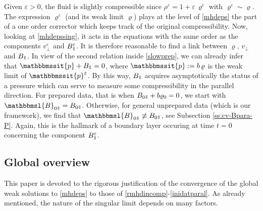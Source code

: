 \documentclass[11pt,reqno]{amsart}
\newcommand{\myparallel}{{\mkern3mu\vphantom{\perp}\vrule depth 0pt\mkern2mu\vrule depth 0pt\mkern3mu}}
\begin{document}
Given $ \varepsilon >0 $, the fluid is slightly compressible since $ \rho^\varepsilon = 1 + \varepsilon \, \varrho^\varepsilon $ with $  \varrho^\varepsilon \sim \varrho $. The expression $ \varrho^\varepsilon $ (and  its weak limit $ \varrho $) plays at the level of \eqref{mhdeps} the part of a one order corrector which keeps track of the original compressibility. Now, looking at \eqref{mhdepssing}, it acts in the equations with the same order as the components $ v^\varepsilon_\perp $ and $  B^\varepsilon_\myparallel $. It is therefore reasonable to find a link between $ \varrho $, $  v_\perp $ and $ B_\myparallel $. In view of the second relation inside  \eqref{slowprep}, we can already infer that $ \mathbbmssit{p} + B_\myparallel = 0 $, where $ \mathbbmssit{p} := b \, \varrho $ is the weak limit of $ \mathbbmssit{p}^\varepsilon $. By this way, $ B_\myparallel $ acquires asymptotically the status of a pressure which can serve to  measure  some  compressibility in the parallel direction. For prepared data, that is when $  B_{0\myparallel} + b \varrho_0 = 0 $, we start with $ \mathbbmsl{B}_{0\myparallel} = B_{0\myparallel} $. Otherwise, for general unprepared data (which is our framework), we find that $ \mathbbmsl{B}_{0\myparallel}\not \equiv B_{0\myparallel} $, see Subsection \ref{ss:cv-Bpara-P}. Again, this is the hallmark of a boundary layer occuring at time $ t = 0 $ concerning the component $ B^\varepsilon_\myparallel $.


\subsection{Global overview}\label{ss:overview} This paper is devoted to the rigorous justification of the convergence of the global weak solutions to \eqref{mhdeps} to those of \eqref{rmhdincomp}-\eqref{inidatparal}. As already mentioned, the nature of the singular limit depends on many factors.

\end{document}
